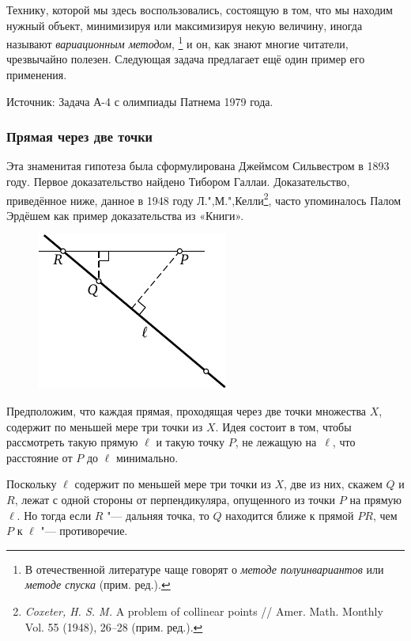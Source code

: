 \documentclass[twoside]{book}
\begin{document}
Технику, которой мы здесь воспользовались, состоящую в том, что мы находим нужный объект, минимизируя или максимизируя некую величину, иногда называют \emph{вариационным методом},%
\footnote{В отечественной литературе чаще говорят о \emph{методе полуинвариантов} или \emph{методе спуска} (прим. ред.).}
и он, как знают многие читатели, чрезвычайно полезен.
Следующая задача предлагает ещё один пример его применения.

\medskip
{\small 
Источник: Задача А-4 с олимпиады Патнема 1979 года.

}


\subsubsection*{Прямая через две точки}%

Эта знаменитая гипотеза была сформулирована Джеймсом Сильвестром в 1893 году.
Первое доказательство найдено Тибором Галлаи. %
Доказательство, приведённое ниже, данное в 1948 году Л.",М.",Келли\footnote{
\emph{Coxeter, H. S. M.} A problem of collinear points /\!/ {Amer. Math. Monthly} Vol. 55 (1948), 26--28 (прим. ред.).}, 
часто упоминалось Палом Эрдёшем как пример доказательства из «Книги».

\begin{figure}[ht!]
\centering
\includegraphics[scale=1.3]{mp/wink-12}
\end{figure}


Предположим, что каждая прямая, проходящая через две точки множества $X$, содержит по меньшей мере три точки из $X$.
Идея состоит в том, чтобы рассмотреть такую прямую $\ell$ и такую точку $P$, не лежащую на~$\ell$, что расстояние от $P$ до $\ell$ минимально.

Поскольку $\ell$ содержит по меньшей мере три точки из $X$, две из них, скажем $Q$ и $R$, лежат с одной стороны от перпендикуляра, опущенного из точки $P$ на прямую $\ell$.
Но тогда если $R$ "--- дальняя точка, то $Q$ находится ближе к прямой $PR$, чем $P$ к $\ell$ "--- противоречие.\heart
\end{document}
